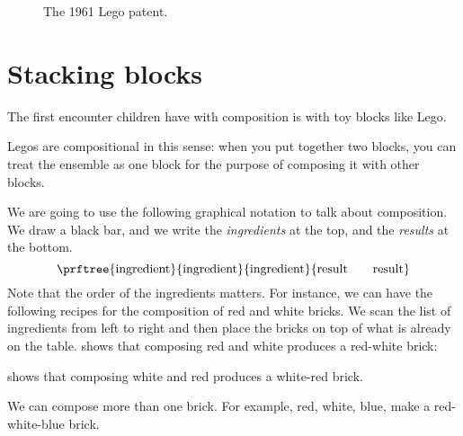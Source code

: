 \begin{figure*}[p]
    \centering
    \caption{The 1961 Lego patent.}
\end{figure*}

\section{Stacking blocks}


The first encounter children have with composition is with toy blocks like Lego.

Legos are compositional in this sense: when you put together two blocks, you can treat the ensemble as one block for the purpose of composing it with other blocks.

We are going to use the following graphical notation to talk about composition.
We draw a black bar, and we write the \emph{ingredients} at the top, and the \emph{results} at the bottom.
%
\begin{equation}
    \prftree{
        \text{ingredient}
    }{
        \text{ingredient}
    }{
        \text{ingredient}
    }{
        \text{result} \quad \quad \text{result}
    }
\end{equation}
%
Note that the order of the ingredients matters.
For instance, we can have the following recipes for the composition of red and white bricks.
We scan the list of ingredients from left to right and then place the bricks on top of what is already on the table.
 shows that composing red and white produces a red-white brick:

%
 shows that composing white and red produces a white-red brick.


We can compose more than one brick.
For example, red, white, blue, make a red-white-blue brick.

